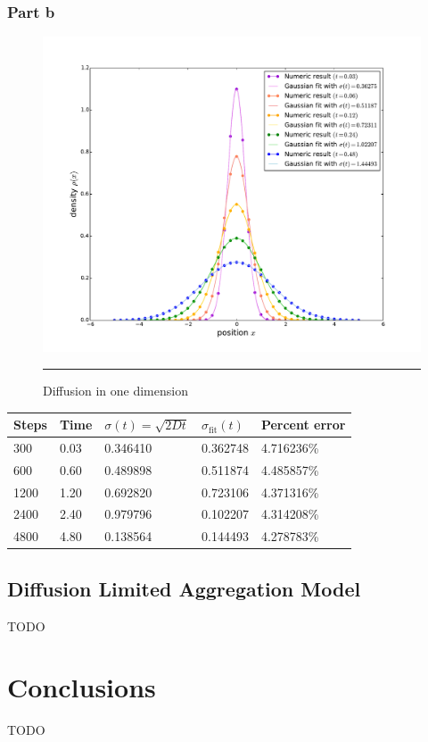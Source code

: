 \documentclass[notitlepage,aps,prd,nofootinbib]{revtex4-1}
\begin{document}
\newpage
\subsubsection{Part b}
\label{subsubsec:results_2_b}
\begin{figure}[!htbc]
  \centering
  \includegraphics[width=.6\textwidth]{../output/plots_for_paper/problem_2/part_b.pdf}
  	{\par\nobreak\rule[9pt]{35em}{0.5pt}\vspace{-5mm}}
	\caption{Diffusion in one dimension}
	\label{fig:2}
\end{figure}

\begin{center}
	\begin{tabular}{ | p{2cm} | p{2cm} | p{2cm} | p{2cm} | p{2cm} |}
		\hline
		Steps & Time & $\sigma(t) = \sqrt{2Dt}$ & $\sigma_{\mathrm{fit}}(t)$ & Percent error\\
		\hline
		300  & 0.03 & 0.346410 & 0.362748 & 4.716236\%\\
		\hline
		600  & 0.60 & 0.489898 & 0.511874 & 4.485857\%\\ 
		\hline
		1200 & 1.20 & 0.692820 & 0.723106 & 4.371316\%\\
		\hline
		2400 & 2.40 & 0.979796 & 0.102207 & 4.314208\%\\
		\hline
		4800 & 4.80 & 0.138564 & 0.144493 & 4.278783\%\\
		\hline
	\end{tabular}
\end{center}

\clearpage
\subsection{Diffusion Limited Aggregation Model}
\label{subsec:results_3}
TODO

\clearpage
\section{Conclusions}
\label{sec:Conclusions}
TODO
\end{document}
